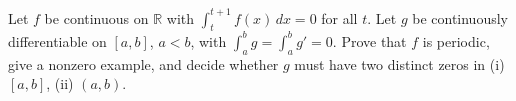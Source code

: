 Let $f$ be continuous on $\mathbb R$ with $\int_t^{t+1}f(x)\,dx=0$ for all $t$. Let $g$ be continuously differentiable on $[a,b]$, $a<b$, with $\int_a^b g=\int_a^b g\prime=0$. Prove that $f$ is periodic, give a nonzero example, and decide whether $g$ must have two distinct zeros in (i) $[a,b]$, (ii) $(a,b)$.
